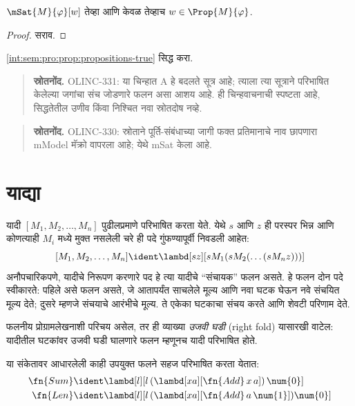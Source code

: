 \begin{prop}
  \label{int:sem:pro:prop:propositions-true}
  $\mSat{M}{\varphi}[w]$ तेव्हा आणि केवळ तेव्हाच $w \in \Prop{M}{\varphi}$.
\end{prop}


\begin{proof}
  सराव.
\end{proof}

\begin{prob}
  \ref{int:sem:pro:prop:propositions-true} सिद्ध करा.
\end{prob}



\begin{quote}\small\textbf{स्रोतनोंद.} OLINC-331: या चिन्हात A हे बदलते सूत्र आहे; त्याला त्या सूत्राने परिभाषित केलेल्या जगांचा संच जोडणारे फलन असा आशय आहे. ही चिन्हवाचनाची स्पष्टता आहे, सिद्धतेतील उणीव किंवा निश्चित नवा स्रोतदोष नव्हे.\end{quote}
\begin{quote}\small\textbf{स्रोतनोंद.} OLINC-330: स्रोताने पूर्ति-संबंधाच्या जागी फक्त प्रतिमानाचे नाव छापणारा mModel मॅक्रो वापरला आहे; येथे mSat केला आहे.\end{quote}










\section{याद्या}\label{lam:ldf:lst:sec}

यादी $[M_1, M_2, \ldots, M_n]$ पुढीलप्रमाणे परिभाषित करता येते.
येथे $s$ आणि $z$ ही परस्पर भिन्न आणि कोणत्याही $M_i$ मध्ये
मुक्त नसलेली चरे ही पदे गुंफण्यापूर्वी निवडली आहेत:
\[
  [M_1, M_2, \ldots, M_n] \ident \lambd[sz][s M_1 (s M_2 (\ldots (s M_n z)))]
\]
अनौपचारिकपणे, यादीचे निरूपण करणारे पद हे त्या यादीचे
“संचायक” फलन असते. हे फलन दोन पदे स्वीकारते: पहिले
असे फलन असते, जे आतापर्यंत साचलेले मूल्य आणि नवा घटक
घेऊन नवे संचयित मूल्य देते; दुसरे म्हणजे संचयाचे आरंभीचे
मूल्य. ते एकेका घटकाचा संचय करते आणि शेवटी परिणाम देते.

\begin{digress}
  फलनीय प्रोग्रामलेखनाशी परिचय असेल, तर ही व्याख्या
  \emph{उजवी घडी} (right fold) यासारखी वाटेल:
  यादीतील घटकांवर उजवी घडी घालणारे फलन म्हणूनच
  यादी परिभाषित होते.
\end{digress}

या संकेतावर आधारलेली काही उपयुक्त फलने सहज परिभाषित
करता येतात:
\begin{align*}
  \fn{Sum} & \ident
  \lambd[l][l \, (\lambd[xa][\fn{Add} \, x \, a])\,  \num{0}]\\
  \fn{Len} & \ident
  \lambd[l][l \, (\lambd[xa][\fn{Add} \, a \, \num{1}]) \num{0}]
\end{align*}

